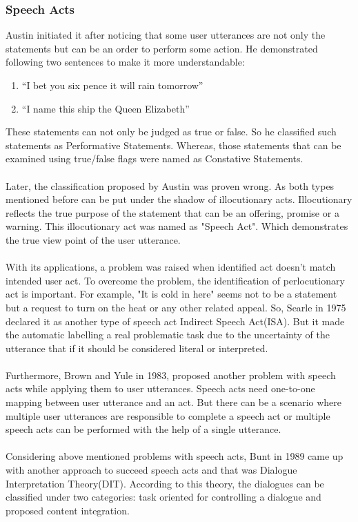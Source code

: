 \subsubsection*{Speech Acts}
Austin initiated it after noticing that some user utterances are not only the statements but can be an order to perform some action. He demonstrated following two sentences to make it more understandable:
\begin{enumerate}
    \item “I bet you six pence it will rain tomorrow”
    \item “I name this ship the Queen Elizabeth”
\end{enumerate} 
These statements can not only be judged as true or false. So he classified such statements as Performative Statements. Whereas, those statements that can be examined using true/false flags were named as Constative Statements.
\\~\\
Later, the classification proposed by Austin was proven wrong. As both types mentioned before can be put under the shadow of illocutionary acts. Illocutionary reflects the true purpose of the statement that can be an offering, promise or a warning. This illocutionary act was named as "Speech Act". Which demonstrates the true view point of the user utterance. 
\\~\\
With its applications, a problem was raised when identified act doesn't match intended user act. To overcome the problem, the identification of perlocutionary act is important. For example, "It is cold in here" seems not to be a statement but a request to turn on the heat or any other related appeal. So, Searle in 1975 declared it as another type of speech act Indirect Speech Act(ISA). But it made the automatic labelling a real problematic task due to the uncertainty of the utterance that if it should be considered literal or interpreted. 
\\~\\
Furthermore, Brown and Yule in 1983, proposed another problem with speech acts while applying them to user utterances. Speech acts need one-to-one mapping between user utterance and an act. But there can be a scenario where multiple user utterances are responsible to complete a speech act or multiple speech acts can be performed with the help of a single utterance.
\\~\\
Considering above mentioned problems with speech acts, Bunt in 1989 came up with another approach to succeed speech acts and that was Dialogue Interpretation Theory(DIT). According to this theory, the dialogues can be classified under two categories: task oriented for controlling a dialogue and proposed content integration. \cite{dialoguemanagementsystems}


